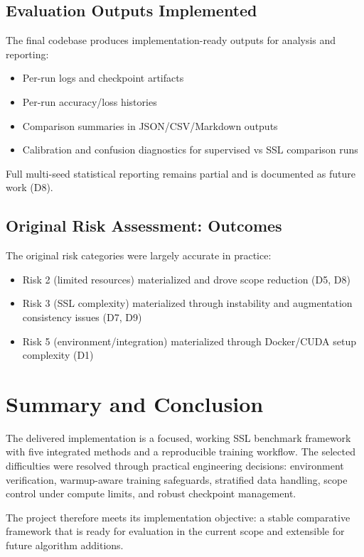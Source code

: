 \subsection{Evaluation Outputs Implemented}

The final codebase produces implementation-ready outputs for analysis and reporting:

\begin{itemize}
    \item Per-run logs and checkpoint artifacts
    \item Per-run accuracy/loss histories
    \item Comparison summaries in JSON/CSV/Markdown outputs
    \item Calibration and confusion diagnostics for supervised vs SSL comparison runs
\end{itemize}

Full multi-seed statistical reporting remains partial and is documented as future work (D8).

\subsection{Original Risk Assessment: Outcomes}

The original risk categories were largely accurate in practice:

\begin{itemize}
    \item Risk 2 (limited resources) materialized and drove scope reduction (D5, D8)
    \item Risk 3 (SSL complexity) materialized through instability and augmentation consistency issues (D7, D9)
    \item Risk 5 (environment/integration) materialized through Docker/CUDA setup complexity (D1)
\end{itemize}

\section{Summary and Conclusion}

The delivered implementation is a focused, working SSL benchmark framework with five integrated methods and a reproducible training workflow. The selected difficulties were resolved through practical engineering decisions: environment verification, warmup-aware training safeguards, stratified data handling, scope control under compute limits, and robust checkpoint management.

The project therefore meets its implementation objective: a stable comparative framework that is ready for evaluation in the current scope and extensible for future algorithm additions.
